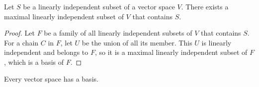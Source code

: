 \begin{theorem}
    Let $S$ be a linearly independent subset of a vector space $V$. There exists a maximal linearly independent subset of $V$ that contains $S$.    
\end{theorem}
\begin{proof}
    Let $F$ be a family of all linearly independent subsets of $V$ that contains $S$. For a chain $C$ in $F$, let $U$ be the union of all its member. This $U$ is linearly independent and belongs to $F$, so it is a maximal linearly independent subset of $F$, which is a basis of $F$.
\end{proof}


\begin{theorem}
    Every vector space has a basis.    
\end{theorem}




